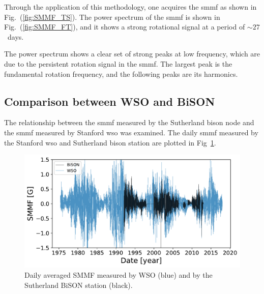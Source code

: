Through the application of this methodology, one acquires the \gls{smmf} as shown in Fig.~(\ref{fig:SMMF_TS}). The power spectrum of the \gls{smmf} is shown in Fig.~(\ref{fig:SMMF_FT}), and it shows a strong rotational signal at a period of $\sim27$~days. 



The power spectrum shows a clear set of strong peaks at low frequency, which are due to the persistent rotation signal in the \gls{smmf}. The largest peak is the fundamental rotation frequency, and the following peaks are its harmonics.


\subsection{Comparison between WSO and BiSON}

The relationship between the \gls{smmf} measured by the Sutherland \gls{bison} node and the \gls{smmf} measured by Stanford \gls{wso} was examined. The daily \gls{smmf} measured by the Stanford \gls{wso} and Sutherland \gls{bison} station are plotted in Fig~\ref{fig:BiSON_and_WSO}.

\begin{figure}[ht!]
    \centering
	\includegraphics[width=\columnwidth]{BiSON_and_WSO.pdf}
    \caption{Daily averaged SMMF measured by WSO (blue) and by the Sutherland BiSON station (black).}
    \label{fig:BiSON_and_WSO}
\end{figure}


